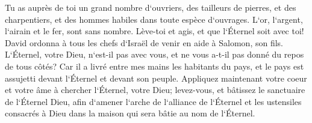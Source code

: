 \verse Tu as auprès de toi un grand nombre d`ouvriers, des tailleurs de pierres, et des charpentiers, et des hommes habiles dans toute espèce d`ouvrages. 
\verse L`or, l`argent, l`airain et le fer, sont sans nombre. Lève-toi et agis, et que l`Éternel soit avec toi! 
\verse David ordonna à tous les chefs d`Israël de venir en aide à Salomon, son fils. 
\verse L`Éternel, votre Dieu, n`est-il pas avec vous, et ne vous a-t-il pas donné du repos de tous côtés? Car il a livré entre mes mains les habitants du pays, et le pays est assujetti devant l`Éternel et devant son peuple. 
\verse Appliquez maintenant votre coeur et votre âme à chercher l`Éternel, votre Dieu; levez-vous, et bâtissez le sanctuaire de l`Éternel Dieu, afin d`amener l`arche de l`alliance de l`Éternel et les ustensiles consacrés à Dieu dans la maison qui sera bâtie au nom de l`Éternel. 

